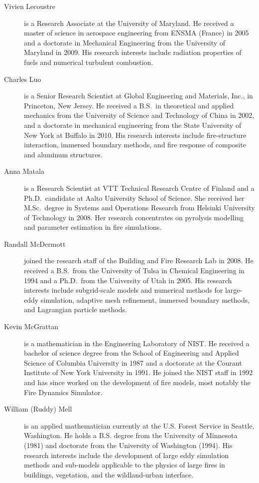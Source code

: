\begin{description}
\item[Vivien Lecoustre] is a Research Associate at the University of Maryland. He received a master of science in aerospace engineering from ENSMA (France) in 2005 and a doctorate in Mechanical Engineering from the University of Maryland in 2009. His research interests include radiation properties of fuels and numerical turbulent combustion. 

\item[Charles Luo] is a Senior Research Scientist at Global Engineering and Materials, Inc., in Princeton, New Jersey. He received a B.S.~in theoretical and applied mechanics from the University of Science and Technology of China in 2002, and a doctorate in mechanical engineering from the State University of New York at Buffalo in 2010. His research interests include fire-structure interaction, immersed boundary methods, and fire response of composite and aluminum structures.

\newpage

\item[Anna Matala] is a Research Scientist at VTT Technical Research Centre of Finland and a Ph.D.~candidate at Aalto University School of Science. She received her M.Sc.~degree in Systems and Operations Research from Helsinki University of Technology in 2008. Her research concentrates on pyrolysis modelling and parameter estimation in fire simulations.

\item[Randall McDermott] joined the research staff of the Building and Fire Research Lab in 2008. He received a B.S.~from the University of Tulsa in Chemical Engineering in 1994 and a Ph.D.~from the University of Utah in 2005. His research interests include subgrid-scale models and numerical methods for large-eddy simulation, adaptive mesh refinement, immersed boundary methods, and Lagrangian particle methods.

\item[Kevin McGrattan] is a mathematician in the Engineering Laboratory of NIST. He received a bachelor of science degree from the School of Engineering and Applied Science of Columbia University in 1987 and a doctorate at the Courant Institute of New York University in 1991. He joined the NIST staff in 1992 and has since worked on the development of fire models, most notably the Fire Dynamics Simulator.

\item[William (Ruddy) Mell] is an applied mathematician currently at the U.S. Forest Service in Seattle, Washington. He holds a B.S. degree from the University of Minnesota (1981) and doctorate from the University of Washington (1994). His research interests include the development of large eddy simulation methods and sub-models applicable to the physics of large fires in buildings, vegetation, and the wildland-urban interface.


\end{description}

